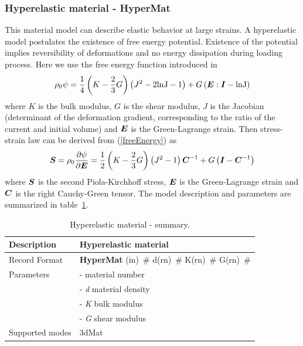 \documentclass[a4paper]{article}
\newcommand{\mbf}[1]{\mbox{\boldmath$#1$}}
\newcommand{\descitem}[1]{{\noindent \bf #1}}
\newcommand{\elemparam}[2]{{{#1\tiny (#2)}~\#}}
\newcommand{\param}[1]{{\it #1}}
\begin{document}
\subsubsection{Hyperelastic material - HyperMat}
This material model can describe elastic behavior at large strains.
A hyperelastic model postulates the existence of free energy potential. Existence of the potential implies reversibility of deformations and no energy dissipation during loading process. Here we use the free energy function introduced in \cite{SimoHughes}
\begin{equation}\label{freeEnergy}
\rho_0 \psi = \frac{1}{4} \left(K - \frac{2}{3}G \right) \left( J^2 - 2 \rm{ln}J -1\right) + G \left(\mbf{E}:\mbf{I} - \rm{ln}J \right)
\end{equation}
where $K$ is the bulk modulus, $G$ is the shear modulus, $J$ is the Jacobian (determinant of the deformation gradient, corresponding to the ratio of the current and initial volume) and $\mbf{E}$ is the Green-Lagrange strain.
Then stress-strain law can be derived from (\ref{freeEnergy}) as
\begin{equation}
\mbf{S} = \rho_0 \frac{\partial \psi}{\partial \mbf{E}} = \frac{1}{2}\left(K - \frac{2}{3}G \right) \left(J^2 -1 \right)\mbf{C}^{-1} + G \left(\mbf{I} -\mbf{C}^{-1} \right)
\end{equation}
where $\mbf{S}$ is the second Piola-Kirchhoff stress, $\mbf{E}$ is the Green-Lagrange strain and $\mbf{C}$ is the right Cauchy-Green tensor.
The model description and parameters are summarized in table~\ref{hyperElMat_table}.
\begin{table}[!htb]
\begin{tabular}{|l|p{9cm}|}
\hline
Description & Hyperelastic material\\
\hline
Record Format & \descitem{HyperMat}  \elemparam{}{in}
\elemparam{d}{rn} \elemparam{K}{rn} \elemparam{G}{rn} \\
Parameters &- \param{} material number\\
&- \param{d} material density\\
&- \param{K} bulk modulus\\
&- \param{G} shear modulus\\
Supported modes& 3dMat\\
\hline
\end{tabular}
\caption{Hyperelastic material - summary.}
\label{hyperElMat_table}
\end{table}
\end{document}
